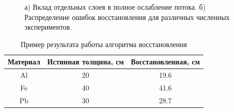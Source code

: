 \documentclass[a4paper]{panl}
\begin{document}
\begin{figure}[t]
    \begin{center}
        \begin{minipage}[h]{0.49\linewidth}
        \end{minipage}
        \hfill
        \begin{minipage}[h]{0.49\linewidth}
        \end{minipage}
        \vspace{-3mm}
        \caption{а) Вклад отдельных слоев в полное ослабление потока. б) Распределение ошибок восстановления для различных численных экспериментов.}
    \end{center}
    \vspace{-5mm}
\end{figure}

\begin{table}
    \caption{Пример результата  работы алгоритма восстановления}
    \label{tab:rec}
\begin{center}
        \begin{tabular}[c]{|c|c|c|}
        \hline 
        Материал & Истинная толщина, см & Восстановленная, см \\ 
        \hline 
        Al & 20 & 19.6 \\ 
        \hline 
        Fe & 40 & 41.6 \\ 
        \hline 
        Pb & 30 & 28.7 \\ 
        \hline 
    \end{tabular}
\end{center}
\end{table}
\end{document}
